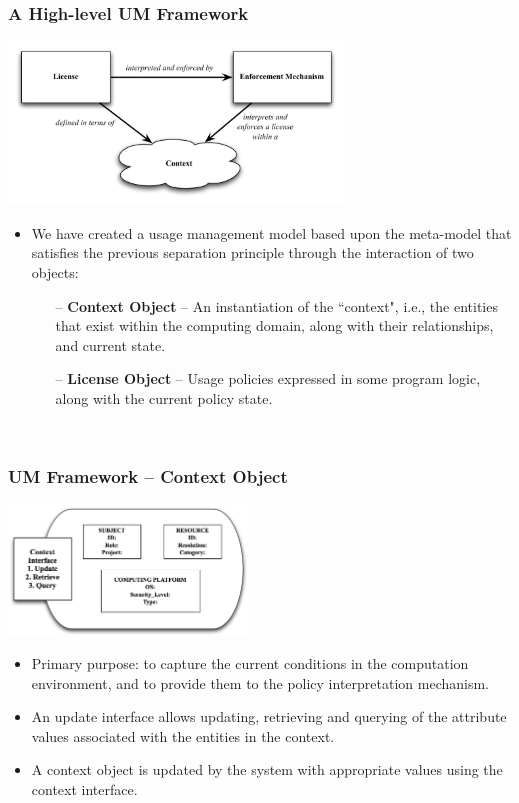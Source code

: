 \documentclass[t,handout, 10pt]{beamer}
\begin{document}
\begin{frame}\frametitle{A High-level UM Framework}
\centerline{\includegraphics[width=3.5in]{model_overview.pdf}} 
\begin{itemize}
\item We have created a usage management model based upon the meta-model that satisfies the previous separation principle through the interaction of two objects:
 \begin{itemize}
  \item[--] \textbf{Context Object} -- An instantiation of the ``context", i.e., the entities that exist within the computing domain, along with their relationships, and current state. 
  \pause
  \item[--] \textbf{License Object} -- Usage policies expressed in some program logic, along with the current policy state.
 \end{itemize}~\\
 \end{itemize}
\end{frame}

\begin{frame}\frametitle{UM Framework -- Context Object}
  \centerline{\includegraphics[width=2.5in]{context-obj.png}}
  \begin{itemize}
   \item Primary purpose: to capture the current conditions in the computation environment, and to provide them to the policy interpretation mechanism.
   \pause
   \item An update interface allows updating, retrieving and querying of the attribute values associated with the entities in the context.
   \pause
   \item A context object is updated by the system with appropriate values using the context interface.
  \end{itemize}
\end{frame}
\end{document}
